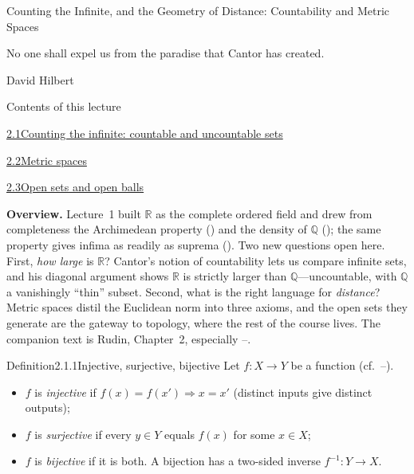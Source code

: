 \documentclass[main.tex]{subfiles}
\begin{document}
%
  {Counting the Infinite, and the Geometry of Distance: Countability and Metric Spaces}

\epigraph{No one shall expel us from the paradise that Cantor has created.}{David Hilbert}

\begin{lecturecontents}{Contents of this lecture}
  \item \hyperlink{2.1}{2.1\quad Counting the infinite: countable and uncountable sets}
  \item \hyperlink{2.2}{2.2\quad Metric spaces}
  \item \hyperlink{2.3}{2.3\quad Open sets and open balls}
\end{lecturecontents}

\bigskip
\noindent\textbf{Overview.} Lecture~1 built $\mathbb R$ as the complete ordered field and drew from
completeness the Archimedean property () and the density of $\mathbb Q$ ();
the same property gives infima as readily as suprema (). Two new questions open here.
First, \emph{how large} is $\mathbb R$? Cantor's notion of countability lets us compare infinite
sets, and his diagonal argument shows $\mathbb R$ is strictly larger than $\mathbb Q$---uncountable,
with $\mathbb Q$ a vanishingly ``thin'' subset. Second, what is the right language for
\emph{distance}? Metric spaces distil the Euclidean norm into three axioms, and the open sets they
generate are the gateway to topology, where the rest of the course lives.
The companion text is Rudin, Chapter~2, especially --.

\clearpage

\begin{Obj}{Definition}{2.1.1}{Injective, surjective, bijective}
Let $f:X\to Y$ be a function (cf.\ --).
\begin{itemize}
  \item $f$ is \emph{injective} if $f(x)=f(x')\Rightarrow x=x'$ (distinct inputs give distinct outputs);
  \item $f$ is \emph{surjective} if every $y\in Y$ equals $f(x)$ for some $x\in X$;
  \item $f$ is \emph{bijective} if it is both. A bijection has a two-sided inverse $f^{-1}:Y\to X$.
\end{itemize}
\end{Obj}
\end{document}
